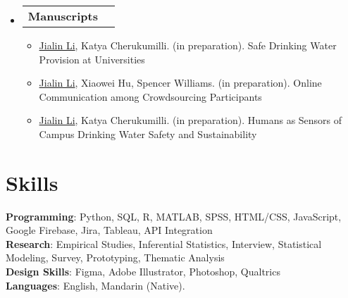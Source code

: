 \documentclass[letterpaper,11pt]{article}
\makeatletter
\newcommand{\resumeItem}[1]{
  \item\small{
    {#1 \vspace{-2pt}}
  }
}
\newcommand{\resumeProjectHeading}[2]{
    \item
    \begin{tabular*}{1.001\textwidth}{l@{\extracolsep{\fill}}r}
      \small#1 & \textbf{\small #2}\\
    \end{tabular*}\vspace{-7pt}
}
\newcommand{\resumeSubHeadingListStart}{\begin{itemize}[leftmargin=0.0in, label={}]}
\newcommand{\resumeSubHeadingListEnd}{\end{itemize}}
\newcommand{\resumeItemListStart}{\begin{itemize}}
\newcommand{\resumeItemListEnd}{\end{itemize}\vspace{-5pt}}
\makeatother
\begin{document}
\vspace{-30pt}
     \resumeSubHeadingListStart
      \resumeProjectHeading
    {\textbf{Manuscripts} }{}
        \resumeItemListStart
        \resumeItem{\underline{Jialin Li}, Katya Cherukumilli. (in preparation). Safe Drinking Water Provision at Universities}
        \resumeItem{\underline{Jialin Li}, Xiaowei Hu, Spencer Williams. (in preparation). Online Communication among Crowdsourcing Participants}
        \resumeItem{\underline{Jialin Li}, Katya Cherukumilli. (in preparation). Humans as Sensors of Campus Drinking Water Safety and Sustainability}
        \resumeItemListEnd
        \resumeSubHeadingListEnd



\vspace{-15pt} 
\section{Skills}
 \begin{itemize}[leftmargin=0.15in, label={}]
    \small{\item{
     \textbf{Programming}{: Python, SQL, R, MATLAB, SPSS, HTML/CSS, JavaScript, Google Firebase, Jira, Tableau, API Integration} \\
     \textbf{Research}{: Empirical Studies, Inferential Statistics, Interview, Statistical Modeling, Survey, Prototyping, Thematic Analysis} \\
     \textbf{Design Skills}{: Figma, Adobe Illustrator, Photoshop, Qualtrics}\\
     \textbf{Languages}{: English, Mandarin (Native).} \\
    }}
 \end{itemize}
\end{document}
